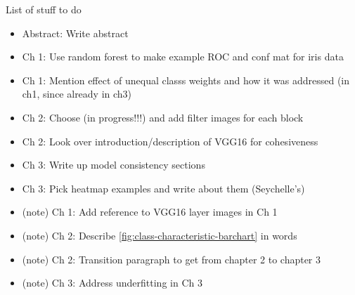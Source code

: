 
List of stuff to do

\begin{itemize}
\item Abstract: Write abstract
\item Ch 1: Use random forest to make example ROC and conf mat for iris data
\item Ch 1: Mention effect of unequal classs weights and how it was addressed (in ch1, since already in ch3)
\item Ch 2: Choose (in progress!!!) and add filter images for each block
\item Ch 2: Look over introduction/description of VGG16 for cohesiveness
\item Ch 3: Write up model consistency sections
\item Ch 3: Pick heatmap examples and write about them (Seychelle's)

\item (\fix note) Ch 1: Add reference to VGG16 layer images in Ch 1
\item (\fix note) Ch 2: Describe \autoref{fig:class-characteristic-barchart} in words
\item (\fix note) Ch 2: Transition paragraph to get from chapter 2 to chapter 3
\item (\fix note) Ch 3: Address underfitting in Ch 3
\end{itemize}
